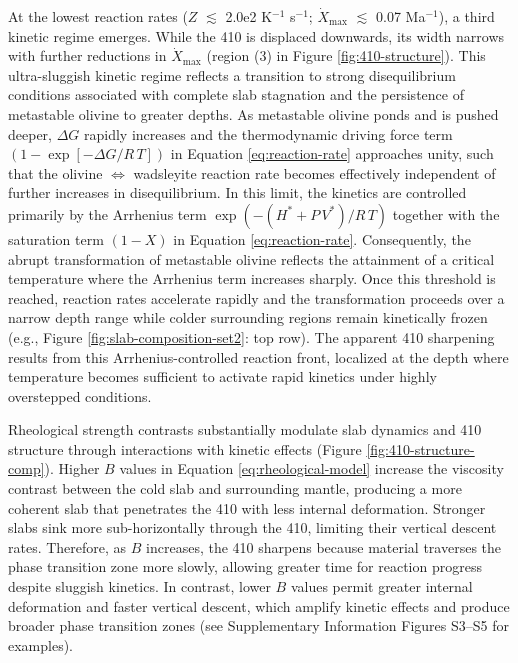 \documentclass[draft,linenumbers]{agujournal2019}
\begin{document}
At the lowest reaction rates (\(Z\) \(\lesssim\) 2.0e2 K\(^{-1}\)
s\(^{-1}\); \(\dot{X}_{\mathrm{max}}\) \(\lesssim\) 0.07 Ma\(^{-1}\)), a
third kinetic regime emerges. While the 410 is displaced downwards, its
width narrows with further reductions in \(\dot{X}_{\mathrm{max}}\)
(region (3) in Figure \ref{fig:410-structure}). This ultra-sluggish
kinetic regime reflects a transition to strong disequilibrium conditions
associated with complete slab stagnation and the persistence of
metastable olivine to greater depths. As metastable olivine ponds and is
pushed deeper, \(\Delta G\) rapidly increases and the thermodynamic
driving force term
\(\left(1 - \exp\left[- \Delta G / R\, T \right]\right)\) in Equation
\ref{eq:reaction-rate} approaches unity, such that the olivine
\(\Leftrightarrow\) wadsleyite reaction rate becomes effectively
independent of further increases in disequilibrium. In this limit, the
kinetics are controlled primarily by the Arrhenius term
\(\exp\left(-(H^{\ast} + P\, V^{\ast}) / R\, T\right)\) together with
the saturation term \(\left(1 - X\right)\) in Equation
\ref{eq:reaction-rate}. Consequently, the abrupt transformation of
metastable olivine reflects the attainment of a critical temperature
where the Arrhenius term increases sharply. Once this threshold is
reached, reaction rates accelerate rapidly and the transformation
proceeds over a narrow depth range while colder surrounding regions
remain kinetically frozen (e.g., Figure \ref{fig:slab-composition-set2}:
top row). The apparent 410 sharpening results from this
Arrhenius-controlled reaction front, localized at the depth where
temperature becomes sufficient to activate rapid kinetics under highly
overstepped conditions.

Rheological strength contrasts substantially modulate slab dynamics and
410 structure through interactions with kinetic effects (Figure
\ref{fig:410-structure-comp}). Higher \(B\) values in Equation
\ref{eq:rheological-model} increase the viscosity contrast between the
cold slab and surrounding mantle, producing a more coherent slab that
penetrates the 410 with less internal deformation. Stronger slabs sink
more sub-horizontally through the 410, limiting their vertical descent
rates. Therefore, as \(B\) increases, the 410 sharpens because material
traverses the phase transition zone more slowly, allowing greater time
for reaction progress despite sluggish kinetics. In contrast, lower
\(B\) values permit greater internal deformation and faster vertical
descent, which amplify kinetic effects and produce broader phase
transition zones (see Supplementary Information Figures S3--S5 for
examples).
\end{document}
